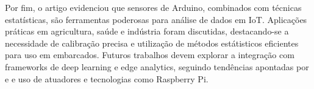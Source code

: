 \documentclass[12pt, a4paper]{article}
\begin{document}
Por fim, o artigo evidenciou que sensores de Arduino, combinados com técnicas estatísticas, são ferramentas
poderosas para análise de dados em IoT. Aplicações práticas em agricultura, saúde e indústria foram discutidas,
destacando-se a necessidade de calibração precisa e utilização de métodos estátisticos eficientes para uso em embarcados. Futuros trabalhos
devem explorar a integração com frameworks de deep learning e edge analytics, seguindo tendências apontadas por
\cite{Adi2020} e \cite{Selmy2024} e uso de atuadores e tecnologias como Raspberry Pi. 

\end{document}

